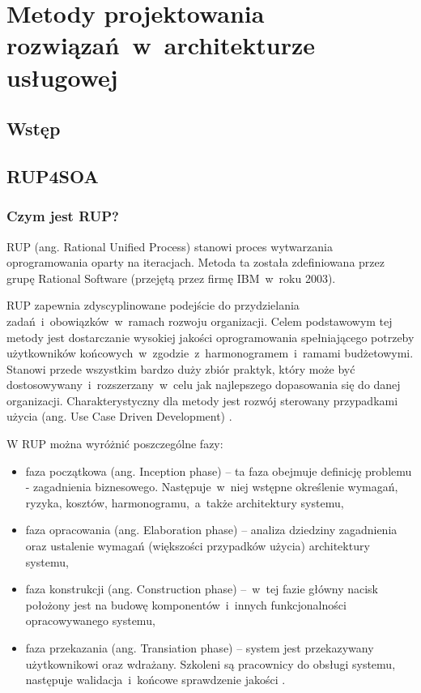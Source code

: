 \chapter{Metody projektowania rozwiązań~w~architekturze usługowej}

\section{Wstęp}

\section{RUP4SOA}
\subsection{Czym jest RUP?}
RUP (ang. Rational Unified Process) stanowi proces  wytwarzania oprogramowania oparty na iteracjach. Metoda ta została zdefiniowana przez grupę Rational Software (przejętą przez firmę IBM~w~roku 2003). 

RUP zapewnia zdyscyplinowane podejście do przydzielania zadań~i~obowiązków~w~ramach rozwoju organizacji. Celem podstawowym tej metody jest dostarczanie wysokiej jakości oprogramowania spełniającego potrzeby użytkowników końcowych~w~zgodzie~z~harmonogramem~i~ramami budżetowymi\cite{RUPIntRat}. Stanowi przede wszystkim bardzo duży zbiór praktyk, który może być dostosowywany~i~rozszerzany~w~celu jak najlepszego dopasowania się do danej organizacji. Charakterystyczny dla metody jest rozwój sterowany przypadkami użycia (ang. Use Case Driven Development) \cite{RUPMartFow}. 

W RUP można wyróżnić poszczególne fazy:
\begin{itemize}
\item{faza początkowa (ang. Inception phase) – ta faza obejmuje definicję problemu - zagadnienia biznesowego. Następuje~w~niej wstępne określenie wymagań, ryzyka, kosztów, harmonogramu,~a~także architektury systemu,}
\item{faza opracowania (ang. Elaboration phase) – analiza dziedziny zagadnienia oraz ustalenie wymagań (większości przypadków użycia) architektury systemu,}
\item{faza konstrukcji (ang. Construction phase) –~w~tej fazie główny nacisk położony jest na budowę komponentów~i~innych funkcjonalności opracowywanego systemu,}
\item{faza przekazania (ang. Transiation phase) – system jest przekazywany użytkownikowi oraz wdrażany. Szkoleni są pracownicy do obsługi systemu, następuje walidacja~i~końcowe sprawdzenie jakości \cite{RUPIntRat}. } 
\end{itemize}

